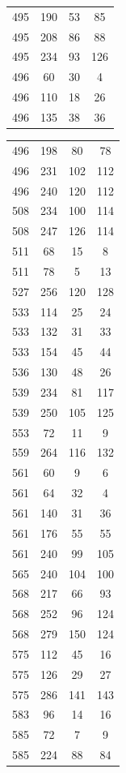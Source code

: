 \documentclass[12pt]{amsproc} %
\theoremstyle{definition}\newtheorem{defn}[thm]{Definition}
\theoremstyle{definition}\newtheorem{rem}[thm]{Remark}
\theoremstyle{definition}\newtheorem{ex}[thm]{Example}
\begin{document}
\begin{table}[ht!]
\begin{minipage}{0.25\textwidth}
\begin{tabular}{c|c|c|c}
      495&190&53&85\\ 
      495&208&86&88\\ 
      495&234&93&126\\ 
      496&60&30&4\\ 
      496&110&18&26\\ 
      496&135&38&36\\ 
            \end{tabular}
	\end{minipage}
    \hfill
    \begin{minipage}{0.25\textwidth}
        \centering
        \begin{tabular}{c|c|c|c}  
      496&198&80&78\\ 
      496&231&102&112\\ 
      496&240&120&112\\
      508&234&100&114\\ 
      508&247&126&114\\ 
      511&68&15&8\\ 
      511&78&5&13\\ 
      527&256&120&128\\ 
      533&114&25&24\\ 
      533&132&31&33\\ 
      533&154&45&44\\ 
      536&130&48&26\\ 
      539&234&81&117\\ 
      539&250&105&125\\ 
      553&72&11&9\\ 
      559&264&116&132\\ 
      561&60&9&6\\ 
      561&64&32&4\\
      561&140&31&36\\ 
      561&176&55&55\\ 
      561&240&99&105\\ 
      565&240&104&100\\
       568&217&66&93\\ 
      568&252&96&124\\ 
      568&279&150&124\\ 
      575&112&45&16\\ 
      575&126&29&27\\ 
      575&286&141&143\\ 
      583&96&14&16\\ 
      585&72&7&9\\ 
      585&224&88&84\\ 

\end{tabular}
\end{minipage}
\end{table}
\end{document}
